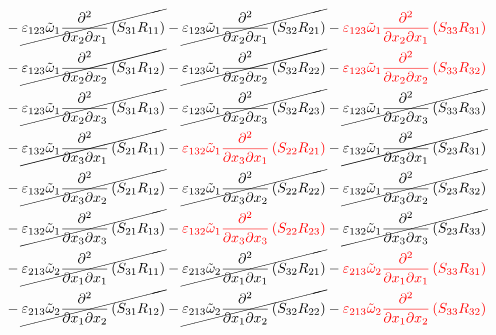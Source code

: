 \begin{equation}
	\begin{split}
&		-\cancel{\varepsilon_{123}\tilde{\omega}_{1}\pdv{}{x_{2}}{x_{1}}\left(S_{31}R_{11}\right)}
		-\cancel{\varepsilon_{123}\tilde{\omega}_{1}\pdv{}{x_{2}}{x_{1}}\left(S_{32}R_{21}\right)}
		-{\color{red}\varepsilon_{123}\tilde{\omega}_{1}\pdv{}{x_{2}}{x_{1}}\left(S_{33}R_{31}\right)}\\
&		-\cancel{\varepsilon_{123}\tilde{\omega}_{1}\pdv{}{x_{2}}{x_{2}}\left(S_{31}R_{12}\right)}
		-\cancel{\varepsilon_{123}\tilde{\omega}_{1}\pdv{}{x_{2}}{x_{2}}\left(S_{32}R_{22}\right)}
		-{\color{red}\varepsilon_{123}\tilde{\omega}_{1}\pdv{}{x_{2}}{x_{2}}\left(S_{33}R_{32}\right)}\\
&		-\cancel{\varepsilon_{123}\tilde{\omega}_{1}\pdv{}{x_{2}}{x_{3}}\left(S_{31}R_{13}\right)}
		-\cancel{\varepsilon_{123}\tilde{\omega}_{1}\pdv{}{x_{2}}{x_{3}}\left(S_{32}R_{23}\right)}
		-\cancel{\varepsilon_{123}\tilde{\omega}_{1}\pdv{}{x_{2}}{x_{3}}\left(S_{33}R_{33}\right)}\\
&		-\cancel{\varepsilon_{132}\tilde{\omega}_{1}\pdv{}{x_{3}}{x_{1}}\left(S_{21}R_{11}\right)}
		-{\color{red}\varepsilon_{132}\tilde{\omega}_{1}\pdv{}{x_{3}}{x_{1}}\left(S_{22}R_{21}\right)}
		-\cancel{\varepsilon_{132}\tilde{\omega}_{1}\pdv{}{x_{3}}{x_{1}}\left(S_{23}R_{31}\right)}\\
&		-\cancel{\varepsilon_{132}\tilde{\omega}_{1}\pdv{}{x_{3}}{x_{2}}\left(S_{21}R_{12}\right)}
		-\cancel{\varepsilon_{132}\tilde{\omega}_{1}\pdv{}{x_{3}}{x_{2}}\left(S_{22}R_{22}\right)}
		-\cancel{\varepsilon_{132}\tilde{\omega}_{1}\pdv{}{x_{3}}{x_{2}}\left(S_{23}R_{32}\right)}\\
&		-\cancel{\varepsilon_{132}\tilde{\omega}_{1}\pdv{}{x_{3}}{x_{3}}\left(S_{21}R_{13}\right)}
		-{\color{red}\varepsilon_{132}\tilde{\omega}_{1}\pdv{}{x_{3}}{x_{3}}\left(S_{22}R_{23}\right)}
		-\cancel{\varepsilon_{132}\tilde{\omega}_{1}\pdv{}{x_{3}}{x_{3}}\left(S_{23}R_{33}\right)}\\
&		-\cancel{\varepsilon_{213}\tilde{\omega}_{2}\pdv{}{x_{1}}{x_{1}}\left(S_{31}R_{11}\right)}
		-\cancel{\varepsilon_{213}\tilde{\omega}_{2}\pdv{}{x_{1}}{x_{1}}\left(S_{32}R_{21}\right)}
		-{\color{red}\varepsilon_{213}\tilde{\omega}_{2}\pdv{}{x_{1}}{x_{1}}\left(S_{33}R_{31}\right)}\\
&		-\cancel{\varepsilon_{213}\tilde{\omega}_{2}\pdv{}{x_{1}}{x_{2}}\left(S_{31}R_{12}\right)}
		-\cancel{\varepsilon_{213}\tilde{\omega}_{2}\pdv{}{x_{1}}{x_{2}}\left(S_{32}R_{22}\right)}
		-{\color{red}\varepsilon_{213}\tilde{\omega}_{2}\pdv{}{x_{1}}{x_{2}}\left(S_{33}R_{32}\right)}\\

\end{split}
\end{equation}
